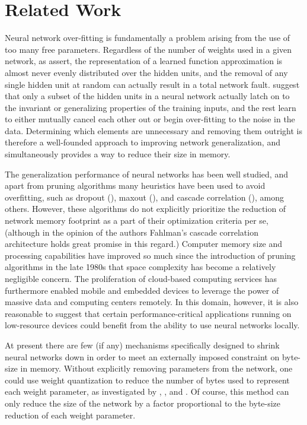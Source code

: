 \section{Related Work}
Neural network over-fitting is fundamentally a problem arising from the use of too many free parameters. Regardless of the number of weights used in a given network, as \cite{segee1991fault} assert, the representation of a learned function approximation is almost never evenly distributed over the hidden units, and the removal of any single hidden unit at random can actually result in a total network fault. \cite{mozer1989using} suggest that only a subset of the hidden units in a neural network actually latch on to the invariant or generalizing properties of the training inputs, and the rest learn to either mutually cancel each other out or begin over-fitting to the noise in the data. Determining which elements are unnecessary and removing them outright is therefore a well-founded approach to improving network generalization, and simultaneously provides a way to reduce their size in memory. 


The generalization performance of neural networks has been well studied, and apart from pruning algorithms many heuristics have been used to avoid overfitting, such as dropout (\cite{srivastava2014dropout}), maxout (\cite{goodfellow2013maxout}), and cascade correlation (\cite{fahlman1989cascade}), among others. However, these algorithms do not explicitly prioritize the reduction of network memory footprint as a part of their optimization criteria per se, (although in the opinion of the authors Fahlman's cascade correlation architecture holds great promise in this regard.) Computer memory size and processing capabilities have improved so much since the introduction of pruning algorithms in the late 1980s that space complexity has become a relatively negligible concern. The proliferation of cloud-based computing services has furthermore enabled mobile and embedded devices to leverage the power of massive data and computing centers remotely. In this domain, however, it is also reasonable to suggest that certain performance-critical applications running on low-resource devices could benefit from the ability to use neural networks locally. 

At present there are few (if any) mechanisms specifically designed to shrink neural networks down in order to meet an externally imposed constraint on byte-size in memory. Without explicitly removing parameters from the network, one could use weight quantization to reduce the number of bytes used to represent each weight parameter, as investigated by \cite{balzer1991weight}, \cite{dundar1994effects}, and \cite{hoehfeld1992learning}. Of course, this method can only reduce the size of the network by a factor proportional to the byte-size reduction of each weight parameter. 

